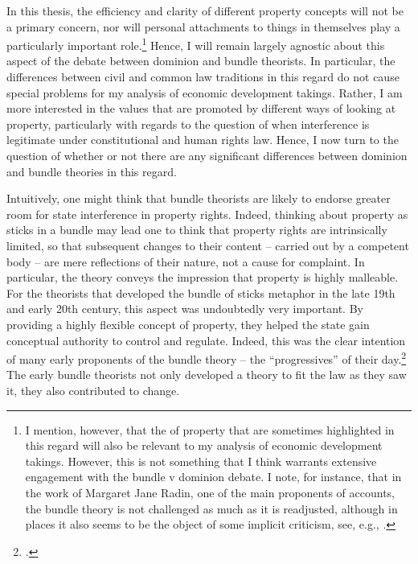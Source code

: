 In this thesis, the efficiency and clarity of different property concepts will not be a primary concern, nor will personal attachments to things in themselves play a particularly important role.\footnote{I mention, however, that the  of property that are sometimes highlighted in this regard will also be relevant to my analysis of economic development takings. However, this is not something that I think warrants extensive engagement with the bundle v dominion debate. I note, for instance, that in the work of Margaret Jane Radin, one of the main proponents of  accounts, the bundle theory is not challenged as much as it is readjusted, although in places it also seems to be the object of some implicit criticism, see, e.g., \cite[127-130]{radin93}.}
Hence, I will remain largely agnostic about this aspect of the debate between dominion and bundle theorists. In particular, the differences between civil and common law traditions in this regard do not cause special problems for my analysis of economic development takings. Rather, I am more interested in the values that are promoted by different ways of looking at property, particularly with regards to the question of when interference is legitimate under constitutional and human rights law. Hence, I now turn to the question of whether or not there are any significant differences between dominion and bundle theories in this regard.

Intuitively, one might think that bundle theorists are likely to endorse greater room for state interference in property rights. Indeed, thinking about property as sticks in a bundle may lead one to think that property rights are intrinsically limited, so that subsequent changes to their content -- carried out by a competent body -- are mere reflections of their nature, not a cause for complaint. In particular, the theory conveys the impression that property is highly malleable. For the theorists that developed the bundle of sticks metaphor in the late 19th and early 20th century, this aspect was undoubtedly very important. By providing a highly flexible concept of property, they helped the state gain conceptual authority to control and regulate. Indeed, this was the clear intention of many early proponents of the bundle theory -- the ``progressives'' of their day.\footcite[195]{klein11} The early bundle theorists not only developed a theory to fit the law as they saw it, they also contributed to change.

